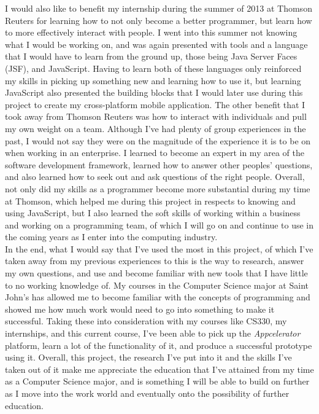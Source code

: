 \documentclass[11pt, twocolumn]{article}
\begin{document}
I would also like to benefit my internship during the summer of 2013 at Thomson Reuters for learning how to not only become a better programmer, but learn how to more effectively interact with people.  I went into this summer not knowing what I would be working on, and was again presented with tools and a language that I would have to learn from the ground up, those being Java Server Faces (JSF), and JavaScript.  Having to learn both of these languages only reinforced my skills in picking up something new and learning how to use it, but learning JavaScript also presented the building blocks that I would later use during this project to create my cross-platform mobile application.  The other benefit that I took away from Thomson Reuters was how to interact with individuals and pull my own weight on a team.  Although I've had plenty of group experiences in the past, I would not say they were on the magnitude of the experience it is to be on when working in an enterprise.  I learned to become an expert in my area of the software development framework, learned how to answer other peoples' questions, and also learned how to seek out and ask questions of the right people.  Overall, not only did my skills as a programmer become more substantial during my time at Thomson, which helped me during this project in respects to knowing and using JavaScript, but I also learned the soft skills of working within a business and working on a programming team, of which I will go on and continue to use in the coming years as I enter into the computing industry.\\

In the end, what I would say that I've used the most in this project, of which I've taken away from my previous experiences to this is the way to research, answer my own questions, and use and become familiar with new tools that I have little to no working knowledge of.  My courses in the Computer Science major at Saint John's has allowed me to become familiar with the concepts of programming and showed me how much work would need to go into something to make it successful.  Taking these into consideration with my courses like CS330, my internships, and this current course, I've been able to pick up the {\it Appcelerator} platform, learn a lot of the functionality of it, and produce a successful prototype using it.  Overall, this project, the research I've put into it and the skills I've taken out of it make me appreciate the education that I've attained from my time as a Computer Science major, and is something I will be able to build on further as I move into the work world and eventually onto the possibility of further education.\\
\end{document}
